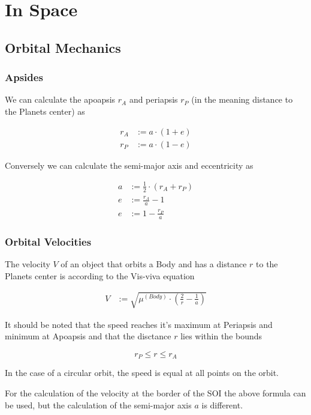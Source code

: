 \documentclass[11pt]{report}
\begin{document}
\chapter{In Space}

\section{Orbital Mechanics}

\subsection{Apsides}

We can calculate the  apoapsis $r_A$ and
 periapsis $r_P$ (in the meaning distance to the
Planets center) as

\begin{align}
r_A & := a \cdot (1 + e)\\
r_P & := a \cdot (1 - e)
\end{align}

Conversely we can calculate the semi-major axis and eccentricity as

\begin{align}
  a & := \frac{1}{2}\cdot(r_A + r_P)\\
  e & := \frac{r_A}{a} - 1\\
  e & := 1 - \frac{r_P}{a}
\end{align}

\subsection{Orbital Velocities}

The velocity $V$ of an object that orbits a Body and has a distance
$r$ to the Planets center is according to the Vis-viva equation
\cite{VisViva}

\begin{align}
V & := \sqrt{\mu^{(Body)} \cdot \left(\frac{2}{r} - \frac{1}{a}\right)}
\end{align}

It should be noted that the speed reaches it's maximum at Periapsis
and minimum at Apoapsis and that the disctance $r$ lies within the
bounds

$$
r_P \leq r \leq r_A
$$

In the case of a circular orbit, the speed is equal at all points on
the orbit.

For the calculation of the velocity at the border of the SOI the above
formula can be used, but the calculation of the semi-major axis $a$ is
different.
\end{document}
